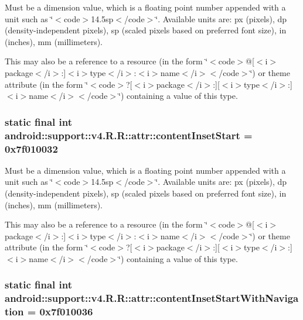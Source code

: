 Must be a dimension value, which is a floating point number appended with a unit such as \char`\"{}$<$code$>$14.5sp$<$/code$>$\char`\"{}. Available units are: px (pixels), dp (density-independent pixels), sp (scaled pixels based on preferred font size), in (inches), mm (millimeters). 

This may also be a reference to a resource (in the form \char`\"{}$<$code$>$@\mbox{[}$<$i$>$package$<$/i$>$:\mbox{]}$<$i$>$type$<$/i$>$:$<$i$>$name$<$/i$>$$<$/code$>$\char`\"{}) or theme attribute (in the form \char`\"{}$<$code$>$?\mbox{[}$<$i$>$package$<$/i$>$:\mbox{]}\mbox{[}$<$i$>$type$<$/i$>$:\mbox{]}$<$i$>$name$<$/i$>$$<$/code$>$\char`\"{}) containing a value of this type. \hypertarget{classandroid_1_1support_1_1v4_1_1_r_1_1attr_18495c38d73263680f4b755ec47bd0de}{
\subsubsection[{contentInsetStart}]{\setlength{\rightskip}{0pt plus 5cm}static final int android::support::v4.R.R::attr::contentInsetStart = 0x7f010032}}
\label{classandroid_1_1support_1_1v4_1_1_r_1_1attr_18495c38d73263680f4b755ec47bd0de}


Must be a dimension value, which is a floating point number appended with a unit such as \char`\"{}$<$code$>$14.5sp$<$/code$>$\char`\"{}. Available units are: px (pixels), dp (density-independent pixels), sp (scaled pixels based on preferred font size), in (inches), mm (millimeters). 

This may also be a reference to a resource (in the form \char`\"{}$<$code$>$@\mbox{[}$<$i$>$package$<$/i$>$:\mbox{]}$<$i$>$type$<$/i$>$:$<$i$>$name$<$/i$>$$<$/code$>$\char`\"{}) or theme attribute (in the form \char`\"{}$<$code$>$?\mbox{[}$<$i$>$package$<$/i$>$:\mbox{]}\mbox{[}$<$i$>$type$<$/i$>$:\mbox{]}$<$i$>$name$<$/i$>$$<$/code$>$\char`\"{}) containing a value of this type. \hypertarget{classandroid_1_1support_1_1v4_1_1_r_1_1attr_7ab1cf43bc973cbff6a041f46654828d}{
\subsubsection[{contentInsetStartWithNavigation}]{\setlength{\rightskip}{0pt plus 5cm}static final int android::support::v4.R.R::attr::contentInsetStartWithNavigation = 0x7f010036}}
\label{classandroid_1_1support_1_1v4_1_1_r_1_1attr_7ab1cf43bc973cbff6a041f46654828d}


